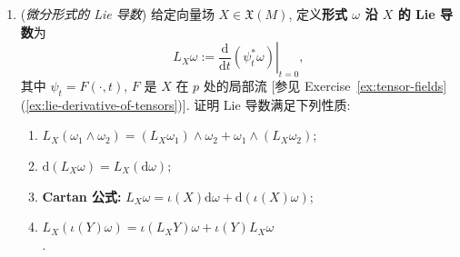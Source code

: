 \begin{RiemannExercise}
\begin{enumerate}[label=(\arabic*),ref=\arabic*,leftmargin=*]
\begin{enumerate}[label=(\alph*),ref=\alph*,leftmargin=*]
{\small (\textbf{Remark:} 本题基于  中的一道练习).}
\end{enumerate}
\item\label{ex:lie-derivative-of-differential-form} (\emph{微分形式的 Lie 导数}) 给定向量场 $X\in\mathfrak{X}(M)$, 定义\textbf{形式 $\omega$ 沿 $X$ 的 Lie 导数}为
\[
  L_X\omega:=\left.\frac{\mathrm{d}}{\mathrm{d}t}(\psi_t^*\omega)\right|_{t=0},
\]
其中 $\psi_t=F(\cdot,t)$, $F$ 是 $X$ 在 $p$ 处的局部流 [参见 Exercise~\ref{ex:tensor-fields}(\ref{ex:lie-derivative-of-tensors})]. 证明 Lie 导数满足下列性质:
\begin{enumerate}[label=(\alph*),leftmargin=*]
\item $L_X(\omega_1\wedge\omega_2)=(L_X\omega_1)\wedge\omega_2+\omega_1\wedge(L_X\omega_2)$;
\item $\mathrm{d}(L_X\omega)=L_X(\mathrm{d}\omega)$;
\item \textbf{Cartan 公式:} $L_X\omega=\iota(X)\mathrm{d}\omega+\mathrm{d}(\iota(X)\omega)$;
\item $L_X(\iota(Y)\omega)=\iota(L_XY)\omega+\iota(Y)L_X\omega$\\.
\end{enumerate}
\end{enumerate}
\end{RiemannExercise}
